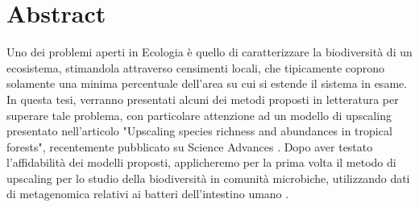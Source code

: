\chapter{Abstract}
 

%
%


Uno dei problemi aperti in Ecologia è quello di caratterizzare la biodiversità di un ecosistema, stimandola
attraverso censimenti locali, che tipicamente coprono solamente una minima percentuale dell'area su cui si estende il sistema in esame.
In questa tesi, verranno presentati alcuni dei metodi proposti in letteratura per superare tale problema, con particolare attenzione ad un modello di upscaling presentato nell'articolo "Upscaling species richness and abundances in tropical forests", recentemente pubblicato su Science Advances \cite{Tovoe1701438}. \newline
Dopo aver testato l'affidabilità dei modelli proposti, applicheremo per la prima volta il metodo di upscaling per lo studio della biodiversità in comunità microbiche, utilizzando dati di metagenomica relativi ai batteri dell'intestino umano \cite{shotgun}.